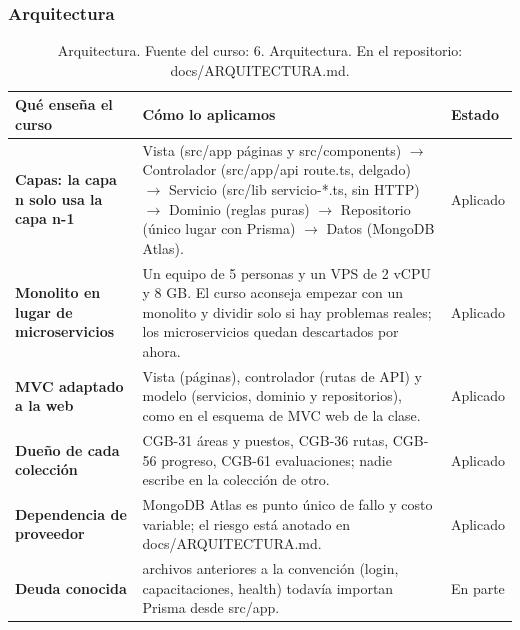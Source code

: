 \documentclass[11pt,a4paper]{article}
\begin{document}
\subsubsection*{Arquitectura}
\begin{table}[H]
\centering
\scriptsize
\renewcommand{\arraystretch}{1.2}
\begin{tabularx}{\linewidth}{|>{\raggedright\arraybackslash}p{3.6cm}|>{\raggedright\arraybackslash}X|>{\centering\arraybackslash}p{1.6cm}|}
\hline
\rowcolor{gray!15}
\textbf{Qué enseña el curso} & \textbf{Cómo lo aplicamos} & \textbf{Estado} \\
\hline
\textbf{Capas: la capa n solo usa la capa n-1} & Vista (src/app páginas y src/components) $\rightarrow$ Controlador (src/app/api route.ts, delgado) $\rightarrow$ Servicio (src/lib servicio-*.ts, sin HTTP) $\rightarrow$ Dominio (reglas puras) $\rightarrow$ Repositorio (único lugar con Prisma) $\rightarrow$ Datos (MongoDB Atlas). & Aplicado \\
\hline
\textbf{Monolito en lugar de microservicios} & Un equipo de 5 personas y un VPS de 2 vCPU y 8 GB. El curso aconseja empezar con un monolito y dividir solo si hay problemas reales; los microservicios quedan descartados por ahora. & Aplicado \\
\hline
\textbf{MVC adaptado a la web} & Vista (páginas), controlador (rutas de API) y modelo (servicios, dominio y repositorios), como en el esquema de MVC web de la clase. & Aplicado \\
\hline
\textbf{Dueño de cada colección} & CGB-31 áreas y puestos, CGB-36 rutas, CGB-56 progreso, CGB-61 evaluaciones; nadie escribe en la colección de otro. & Aplicado \\
\hline
\textbf{Dependencia de proveedor} & MongoDB Atlas es punto único de fallo y costo variable; el riesgo está anotado en docs/ARQUITECTURA.md. & Aplicado \\
\hline
\textbf{Deuda conocida} & 12 archivos anteriores a la convención (login, capacitaciones, health) todavía importan Prisma desde src/app. & En parte \\
\hline
\end{tabularx}
\caption{Arquitectura. Fuente del curso: 6. Arquitectura. En el repositorio: docs/ARQUITECTURA.md.}
\end{table}
\end{document}
